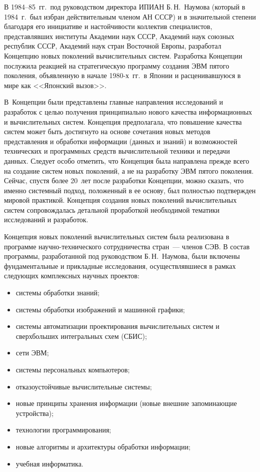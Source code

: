 \begin{multicols}{2}
      В 1984--85~гг.\ под руководством директора \mbox{ИПИАН}
Б.\,Н.~Наумова (который в 1984~г.\ был избран действительным
членом АН СССР) и в значительной степени благодаря его
инициативе и настойчивости коллектив специалистов,
пред\-став\-ляв\-ших институты Академии наук СССР, Академий наук
союзных республик СССР, Академий наук стран Восточной Европы,
разработал Концепцию новых поколений вы\-чис\-ли\-тель\-ных сис\-тем.
Разработка Концепции послужила реакцией на стратегическую
программу создания ЭВМ пятого поколения, объявленную в начале
1980-х~гг.\ в Японии и расценивавшуюся в мире как <<Японский
вызов>>. 

В~Концепции были представлены главные направления
исследований и разработок с целью получения принципиально
нового качества информационных и вычислительных систем.
Концепция предполагала, что повышение качества систем может
быть достигнуто на основе сочетания новых методов представления
и обработки информации (данных и знаний) и возможностей
технических и программных средств вычислительной техники и
передачи данных. Следует особо отметить, что Концепция была
направлена прежде всего на создание систем новых поколений, а не
на разработку ЭВМ пятого поколения. Сейчас, спустя более 20~лет
после разработки Концепции, можно сказать, что именно системный
подход, положенный в ее основу, был полностью подтвержден
мировой практикой. Концепция создания новых поколений
вычислительных систем сопровождалась детальной проработкой
необходимой тематики исследований и разработок.

Концепция  новых поколений вычислительных сис\-тем была
реализована в программе на\-уч\-но-тех\-ни\-че\-ско\-го сотрудничества
стран~--- членов СЭВ. В состав программы, разработанной под
руководством Б.\,Н.~Наумова, были включены фундаментальные и
прикладные исследования, осуществлявшиеся в рамках следующих
комплексных научных проектов:
      \begin{itemize}
\item системы обработки знаний;
\item системы обработки изображений и машинной графики;
\item системы автоматизации проектирования вы\-чис\-ли\-тель\-ных
сис\-тем и сверхбольших интегральных схем (СБИС);
\item сети ЭВМ;
\item системы персональных компьютеров;
\item отказоустойчивые вычислительные системы;
\item новые принципы хранения информации (новые внешние
запоминающие устройства);
\item технологии программирования;
\item новые алгоритмы и архитектуры обработки информации;
\item учебная информатика.
\end{itemize}


\end{multicols}
